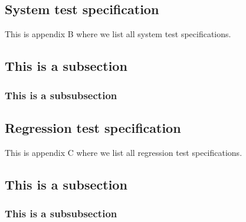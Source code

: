 \documentclass[a4paper]{article}
\begin{document}
\newpage
\begin{appendices}

\section{System test specification}
This is appendix B where we list all system test specifications.

\subsection{This is a subsection}

\subsubsection{This is a subsubsection}

\end{appendices}

\newpage
\begin{appendices}
\section{Regression test specification}
This is appendix C where we list all regression test specifications.

\subsection{This is a subsection}

\subsubsection{This is a subsubsection}
\end{appendices}
\end{document}
